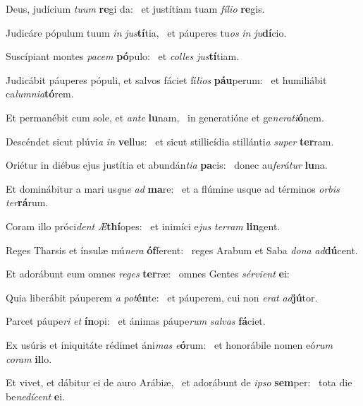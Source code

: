 \item Deus, judícium \textit{tuum} \textbf{re}gi da:~\psstar{} et justítiam tuam \textit{fílio} \textbf{re}gis.
\item Judicáre pópulum tuum \textit{in} \textit{jus}\textbf{tí}tia,~\psstar{} et páuperes tu\textit{os} \textit{in} \textit{ju}\textbf{dí}cio.
\item Suscípiant montes \textit{pacem} \textbf{pó}pulo:~\psstar{} et \textit{colles} \textit{jus}\textbf{tí}tiam.
\item Judicábit páuperes pópuli, et salvos fáciet fí\textit{lios} \textbf{páu}perum:~\psstar{} et humiliábit ca\textit{lumnia}\textbf{tó}rem.
\item Et permanébit cum sole, et \textit{ante} \textbf{lu}nam,~\psstar{} in generatióne et ge\textit{nerati}\textbf{ó}nem.
\item Descéndet sicut plúvi\textit{a} \textit{in} \textbf{vel}lus:~\psstar{} et sicut stillicídia stillánti\textit{a} \textit{super} \textbf{ter}ram.
\item Oriétur in diébus ejus justítia et abundán\textit{tia} \textbf{pa}cis:~\psstar{} donec au\textit{ferátur} \textbf{lu}na.
\item Et dominábitur a mari us\textit{que} \textit{ad} \textbf{ma}re:~\psstar{} et a flúmine usque ad términos \textit{orbis} \textit{ter}\textbf{rá}rum.
\item Coram illo próci\textit{dent} \textit{Æ}\textbf{thí}opes:~\psstar{} et inimíci e\textit{jus} \textit{terram} \textbf{lin}gent.
\item Reges Tharsis et ínsulæ mú\textit{nera} \textbf{óf}ferent:~\psstar{} reges Arabum et Saba \textit{dona} \textit{ad}\textbf{dú}cent.
\item Et adorábunt eum omnes \textit{reges} \textbf{ter}ræ:~\psstar{} omnes Gentes \textit{sérvient} \textbf{e}i:
\item Quia liberábit páuperem \textit{a} \textit{pot}\textbf{én}te:~\psstar{} et páuperem, cui non \textit{erat} \textit{ad}\textbf{jú}tor.
\item Parcet páupe\textit{ri} \textit{et} \textbf{ín}opi:~\psstar{} et ánimas páupe\textit{rum} \textit{salvas} \textbf{fá}ciet.
\item Ex usúris et iniquitáte rédimet áni\textit{mas} \textit{e}\textbf{ó}rum:~\psstar{} et honorábile nomen eó\textit{rum} \textit{coram} \textbf{il}lo.
\item Et vivet, et dábitur ei de auro Arábiæ,~\pscross{} et adorábunt de \textit{ipso} \textbf{sem}per:~\psstar{} tota die be\textit{nedícent} \textbf{e}i.
